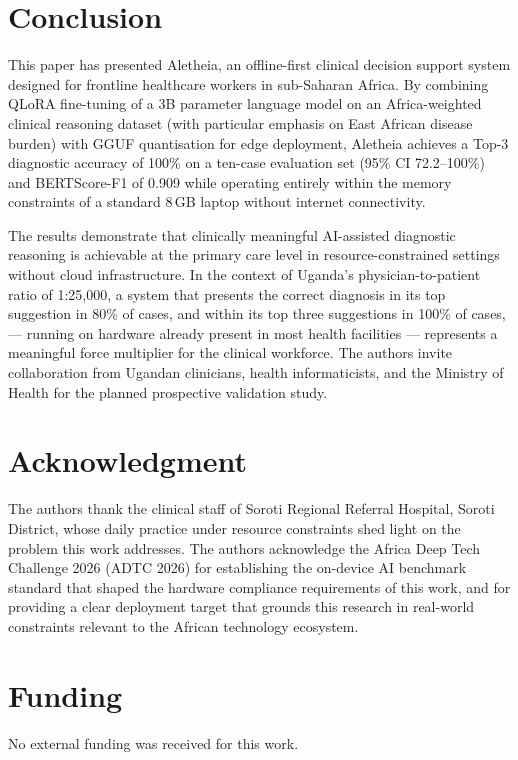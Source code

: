 \documentclass[journal]{IEEEtran}
\begin{document}
\section{Conclusion}
\label{sec:conclusion}

This paper has presented Aletheia, an offline-first clinical
decision support system designed for frontline healthcare workers
in sub-Saharan Africa. By combining QLoRA fine-tuning of a 3B
parameter language model on an Africa-weighted clinical reasoning dataset
(with particular emphasis on East African disease burden) with GGUF quantisation for edge deployment,
Aletheia achieves a Top-3 diagnostic accuracy of 100\% on a
ten-case evaluation set (95\% CI 72.2--100\%) and
BERTScore-F1 of 0.909 while operating entirely within the memory
constraints of a standard 8\,GB laptop without internet
connectivity.

The results demonstrate that clinically meaningful AI-assisted
diagnostic reasoning is achievable at the primary care level in
resource-constrained settings without cloud infrastructure. In
the context of Uganda's physician-to-patient ratio of 1:25{,}000,
a system that presents the correct diagnosis in its top suggestion
in 80\% of cases, and within its top three suggestions in 100\% of cases, --- running on hardware already present in most
health facilities --- represents a meaningful force multiplier for
the clinical workforce.
The authors invite collaboration from Ugandan
clinicians, health informaticists, and the Ministry of Health for
the planned prospective validation study.

\section*{Acknowledgment}

The authors thank the clinical staff of Soroti Regional Referral
Hospital, Soroti District, whose daily practice under resource
constraints shed light on the problem this work addresses. The authors acknowledge the Africa Deep
Tech Challenge 2026 (ADTC 2026) for establishing the on-device
AI benchmark standard that shaped the hardware compliance
requirements of this work, and for providing a clear deployment
target that grounds this research in real-world constraints
relevant to the African technology ecosystem.

\section*{Funding}
No external funding was received for this work.
\end{document}
